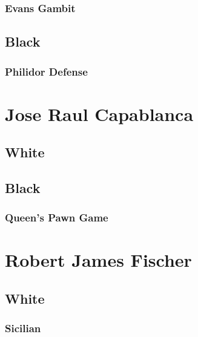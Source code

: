 \documentclass[]{book}
\begin{document}
\hypertarget{evans-gambit}{%
\subsection{Evans Gambit}\label{evans-gambit}}

\hypertarget{black}{%
\section{Black}\label{black}}

\hypertarget{philidor-defense}{%
\subsection{Philidor Defense}\label{philidor-defense}}

\hypertarget{capablanca}{%
\chapter{Jose Raul Capablanca}\label{capablanca}}

\hypertarget{white-1}{%
\section{White}\label{white-1}}

\hypertarget{black-1}{%
\section{Black}\label{black-1}}

\hypertarget{queens-pawn-game}{%
\subsection{Queen's Pawn Game}\label{queens-pawn-game}}

\hypertarget{fischer}{%
\chapter{Robert James Fischer}\label{fischer}}

\hypertarget{white-2}{%
\section{White}\label{white-2}}

\hypertarget{sicilian}{%
\subsection{Sicilian}\label{sicilian}}
\end{document}
